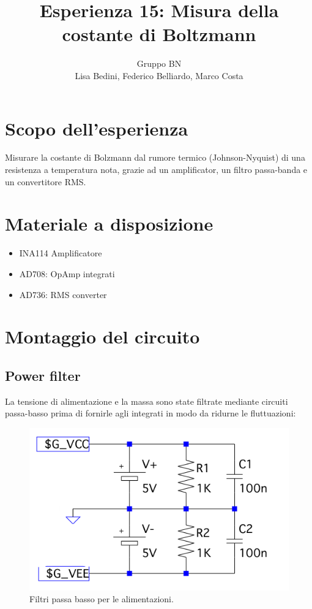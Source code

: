 \documentclass[10pt,a4paper]{article}
\author{Gruppo BN \\Lisa Bedini,  Federico Belliardo, Marco Costa}
\title{Esperienza 15: Misura della costante di Boltzmann}
\begin{document}
\maketitle
\section{Scopo dell'esperienza}
Misurare la costante di Bolzmann dal rumore termico (Johnson-Nyquist) di una resistenza a temperatura nota, grazie ad un amplificator, un filtro passa-banda e un convertitore RMS.

\section{Materiale a disposizione}
\begin{itemize}
\item INA114 Amplificatore
\item AD708: OpAmp integrati
\item AD736: RMS converter
\end{itemize}

\section{Montaggio del circuito}
\subsection{Power filter}
La tensione di alimentazione e la massa sono state filtrate mediante circuiti passa-basso prima di fornirle agli integrati in modo da ridurne le fluttuazioni:\\

\begin{figure}[!htb]
\centering
\includegraphics[scale=0.5]{powerfilter.png}
\caption{Filtri passa basso per le alimentazioni.\label{power}}
\end{figure}
\end{document}
